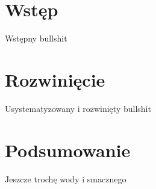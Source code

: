 \documentclass[a4paper,11pt]{article} %
\begin{document}


\section{Wstęp}
Wstępny bullshit
\section{Rozwinięcie}
Usystematyzowany i rozwinięty bullshit
\section{Podsumowanie}
Jeszcze trochę wody i smacznego \smiley

\newpage

%
%

%

\appendix

\end{document}
